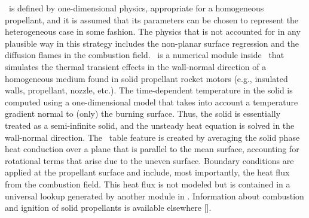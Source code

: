 \setcounter{figure}{0}
\setcounter{table}{0}
\setcounter{equation}{0}


\Rocburn\ is defined by one-dimensional physics, appropriate for a homogeneous propellant, and it is assumed that its parameters can be chosen to represent the heterogeneous case in some fashion. The physics that is not accounted for in any plausible way in this strategy includes the non-planar surface regression and the diffusion flames in the combustion field. \Rocburn\ is a numerical module inside \Rocstar\ that simulates the thermal transient effects in the wall-normal direction of a homogeneous medium found in solid propellant rocket motors (e.g., insulated walls, propellant, nozzle, etc.). The time-dependent temperature in the solid is computed using a one-dimensional model that takes into account a temperature gradient normal to (only) the burning surface. Thus, the solid is essentially treated as a semi-infinite solid, and the unsteady heat equation is solved in the wall-normal direction. The \Rocburn\ table feature is created by averaging the solid phase heat conduction over a plane that is parallel to the mean surface, accounting for rotational terms that arise due to the uneven surface. Boundary conditions are applied at the propellant surface and include, most importantly, the heat flux from the combustion field. This heat flux is not modeled but is contained in a universal lookup generated by another module in \Rocstar. Information about combustion and ignition of solid propellants is available elsewhere [\cite{Ibiricu:1975,Blomshield:1997,Ward:1998,Brewster:2000,Chen:2002,Jackson:2002,Massa:2002,Massa:2004,Massa:2005}].
